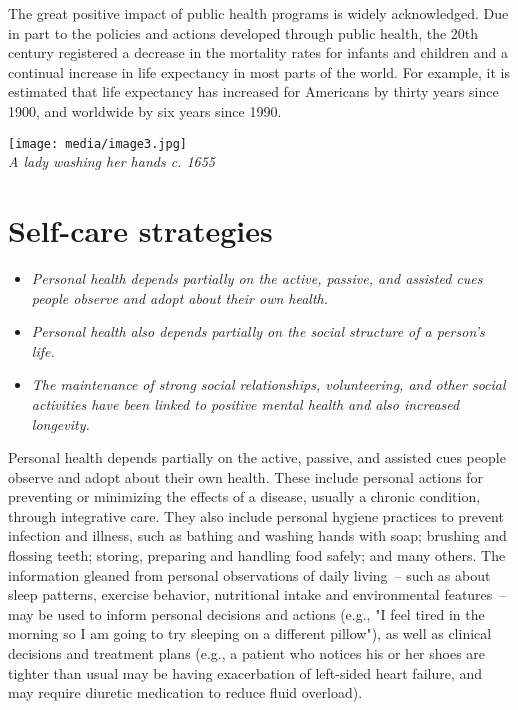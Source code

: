 The great positive impact of public health programs is widely
acknowledged. Due in part to the policies and actions developed through
public health, the 20th century registered a decrease in the mortality
rates for infants and children and a continual increase in life
expectancy in most parts of the world. For example, it is estimated that
life expectancy has increased for Americans by thirty years since 1900,
and worldwide by six years since 1990.

\texttt{[image: media/image3.jpg]}\\
\emph{A lady washing her hands c. 1655}

\section{Self-care strategies}\label{self-care-strategies}

\begin{itemize}
\item
  \emph{Personal health depends partially on the active, passive, and
  assisted cues people observe and adopt about their own health.}
\item
  \emph{Personal health also depends partially on the social structure
  of a person's life.}
\item
  \emph{The maintenance of strong social relationships, volunteering,
  and other social activities have been linked to positive mental health
  and also increased longevity.}
\end{itemize}

Personal health depends partially on the active, passive, and assisted
cues people observe and adopt about their own health. These include
personal actions for preventing or minimizing the effects of a disease,
usually a chronic condition, through integrative care. They also include
personal hygiene practices to prevent infection and illness, such as
bathing and washing hands with soap; brushing and flossing teeth;
storing, preparing and handling food safely; and many others. The
information gleaned from personal observations of daily living~-- such
as about sleep patterns, exercise behavior, nutritional intake and
environmental features~-- may be used to inform personal decisions and
actions (e.g., "I feel tired in the morning so I am going to try
sleeping on a different pillow"), as well as clinical decisions and
treatment plans (e.g., a patient who notices his or her shoes are
tighter than usual may be having exacerbation of left-sided heart
failure, and may require diuretic medication to reduce fluid overload).


